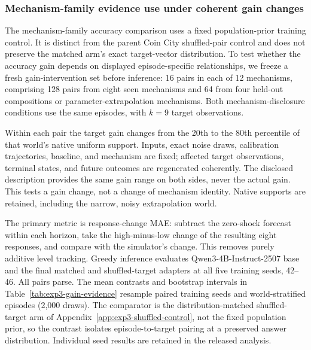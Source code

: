 \subsubsection{Mechanism-family evidence use under coherent gain changes}
\label{app:exp3-evidence-use}

The mechanism-family accuracy comparison uses a fixed population-prior training
control. It is distinct from the parent Coin City shuffled-pair control and
does not preserve the matched arm's exact target-vector distribution. To test
whether the accuracy gain depends on displayed episode-specific relationships,
we freeze a fresh gain-intervention set before inference: 16 pairs in each of
12 mechanisms, comprising 128 pairs from eight seen mechanisms and 64 from
four held-out compositions or parameter-extrapolation mechanisms. Both
mechanism-disclosure conditions use the same episodes, with $k=9$ target
observations.

Within each pair the target gain changes from the 20th to the 80th percentile
of that world's native uniform support. Inputs, exact noise draws, calibration
trajectories, baseline, and mechanism are fixed; affected target observations,
terminal states, and future outcomes are regenerated coherently. The disclosed
description provides the same gain range on both sides, never the actual gain.
This tests a gain change, not a change of mechanism identity. Native supports
are retained, including the narrow, noisy extrapolation world.

The primary metric is response-change MAE: subtract the zero-shock forecast
within each horizon, take the high-minus-low change of the resulting eight
responses, and compare with the simulator's change. This removes purely
additive level tracking. Greedy inference evaluates Qwen3-4B-Instruct-2507
base and the final matched and shuffled-target adapters at all five training
seeds, 42--46. All pairs parse. The mean contrasts and bootstrap intervals in
Table~\ref{tab:exp3-gain-evidence} resample paired training seeds and
world-stratified episodes (2,000 draws). The comparator is the
distribution-matched shuffled-target arm of
Appendix~\ref{app:exp3-shuffled-control}, not the fixed population prior, so
the contrast isolates episode-to-target pairing at a preserved answer
distribution. Individual seed results are retained in the released analysis.

\begin{table}[htbp]
\centering\footnotesize
\setlength{\tabcolsep}{3pt}
\resizebox{\linewidth}{!}{}
\caption{\textbf{Better gain tracking on seen mechanisms does not establish
transferred evidence use.} Entries are response-change MAE (lower is better);
trained entries average the five training seeds 42--46. No change is an
invariant predictor. Slope M and Slope S are matched and shuffled tracking
slopes (ideal 1, zero for no response to changed evidence). Positive
shuffled-minus-matched contrasts favor matched training. Both held-out
intervals include zero, and matched held-out errors exceed the no-change baseline.}
\label{tab:exp3-gain-evidence}
\end{table}


